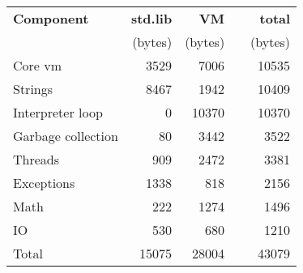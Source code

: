 \begin{tabular}{l|r|r|cr}
    \hline
    \bfseries Component   & \bfseries std.lib & \bfseries VM & & \bfseries total \\
                          & (bytes)                   & (bytes)              & & (bytes)  \\
    \hline\hline
    Core vm               &  3529                     &  7006                & &           10535 \\
    Strings               &  8467                     &  1942                & &           10409 \\
    Interpreter loop      &     0                     & 10370                & &           10370 \\
    Garbage collection    &    80                     &  3442                & &            3522 \\
    Threads               &   909                     &  2472                & &            3381 \\
    Exceptions            &  1338                     &   818                & &            2156 \\
    Math                  &   222                     &  1274                & &            1496 \\
    IO                    &   530                     &   680                & &            1210 \\
    Total                 & 15075                     & 28004                & &           43079 \\
    \hline
\end{tabular}